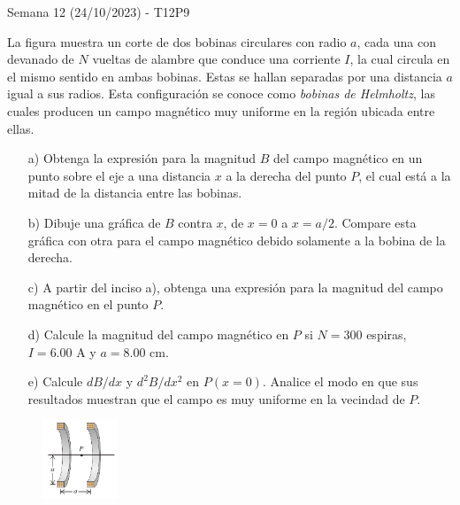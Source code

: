 \begin{frame}{Semana 12 (24/10/2023) - T12P9}
\scriptsize

    La figura muestra un corte de dos
bobinas circulares con radio $a$, cada una con
devanado de $N$ vueltas de alambre que conduce una corriente $I$, la cual
circula en el mismo sentido en ambas bobinas. Estas se hallan separadas por una distancia $a$ igual a sus radios. Esta configuración se
conoce como \textit{bobinas de Helmholtz}, las cuales producen un campo
magnético muy uniforme en la región ubicada entre ellas. 

\begin{itemize}
         \item[a)] Obtenga
la expresión para la magnitud $B$ del campo magnético en un punto
sobre el eje a una distancia $x$ a la derecha del punto $P$, el cual está a la
mitad de la distancia entre las bobinas.
         \item[b)] Dibuje una gráfica de $B$ contra $x$, de $x = 0$ a $x = a/2$. Compare esta gráfica con otra para el campo
magnético debido solamente a la bobina de la derecha.
         \item[c)]  A partir del
inciso a), obtenga una expresión para la magnitud del campo magnético en el punto $P$.
         \item[d)] Calcule la magnitud del campo magnético en $P$
si $N = 300$ espiras, $I = 6.00$ A y $a = 8.00$ cm.
         \item[e)] Calcule $dB/dx$ y
$d^2B/dx^2$ en $P(x = 0)$. Analice el modo en que sus resultados muestran
que el campo es muy uniforme en la vecindad de $P$.
     \end{itemize}

     \begin{figure}
        \centering
        \includegraphics[width=0.2\textwidth]{figures/t14p3.png}
    \end{figure}
    
\end{frame}

